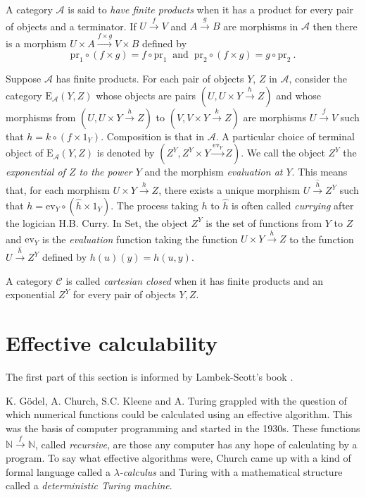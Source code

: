 \documentclass[a4paper,12pt]{article}
\theoremstyle{step}
\newcommand{\xra}{\xrightarrow}
\def\CA{{\mathscr A}}
\def\CC{{\mathscr C}}
\begin{document}
A category $\CA$ is said to {\em have finite products} when it has a product for every pair of objects
and a terminator. If $U\xra{f}V$ and $A\xra{g}B$ are morphisms in $\CA$ then there is a morphism
$U\times A\xra{f\times g} V\times B$ defined by 
$$\mathrm{pr}_1\circ (f\times g) = f\circ \mathrm{pr}_1
\ \text{ and } \ \mathrm{pr}_2\circ (f\times g) = g\circ \mathrm{pr}_2 \ .$$     

Suppose $\CA$ has finite products. For each pair of objects $Y$, $Z$ in $\CA$, consider the category
$\mathrm{E}_{\CA}(Y,Z)$ whose objects are pairs $(U, U\times Y\xra{h} Z)$ and whose morphisms
from $(U, U\times Y\xra{h} Z)$ to $(V, V\times Y\xra{k} Z)$ are morphisms $U\xra{f}V$ such that 
$h= k\circ (f\times 1_Y)$. Composition is that in $\CA$. A particular choice of terminal object
of $\mathrm{E}_{\CA}(Y,Z)$ is denoted by $(Z^Y, Z^Y\times Y\xra{\mathrm{ev}_Y} Z)$.
We call the object $Z^Y$ the {\em exponential of $Z$ to the power $Y$} and the morphism
{\em evaluation at $Y$}. This means that, for each morphism $U\times Y\xra{h} Z$, there
exists a unique morphism $U\xra{\hat{h}}Z^Y$ such that $h = \mathrm{ev}_Y \circ (\hat{h}\times 1_Y)$.
The process taking $h$ to $\hat{h}$ is often called {\em currying} after the logician H.B. Curry. 
 In $\mathrm{Set}$, the object $Z^Y$ is the set of functions from $Y$ to $Z$ and $\mathrm{ev}_Y$
 is the {\em evaluation} function taking the function $U\times Y\xra{h}Z$ to the function $U\xra{\hat{h}}Z^Y$ defined by $h(u)(y) = h(u,y)$. 
 
 A category $\CC$ is called {\em cartesian closed} when it has finite products and an exponential $Z^Y$ for every pair of objects $Y, Z$. 
 
 \section{Effective calculability}\label{Effcal}
  
The first part of this section is informed by Lambek-Scott's book \cite{LamSco}.

 K. G\"odel, A. Church, S.C. Kleene and A. Turing grappled with the question of which
 numerical functions could be calculated using an effective algorithm. This was the 
 basis of computer programming and started in the 1930s. These functions 
 $\mathbb{N}\xra{f}\mathbb{N}$, called {\em recursive}, are those any computer has any hope
 of calculating by a program. To say what effective algorithms were, Church came up with a 
 kind of formal language called a {\em $\lambda$-calculus} and Turing with a mathematical structure called a {\em deterministic Turing machine}.   
 
\end{document}
